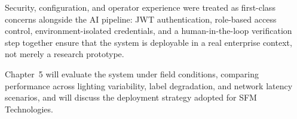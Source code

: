 Security, configuration, and operator experience were treated as first-class concerns alongside the AI pipeline: JWT authentication, role-based access control, environment-isolated credentials, and a human-in-the-loop verification step together ensure that the system is deployable in a real enterprise context, not merely a research prototype.

Chapter~5 will evaluate the system under field conditions, comparing performance across lighting variability, label degradation, and network latency scenarios, and will discuss the deployment strategy adopted for SFM Technologies.
